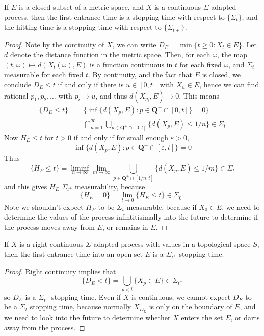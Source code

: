 \begin{lemma}
    If $E$ is a closed subset of a metric space, and $X$ is a continuous $\Sigma$ adapted process, then the first entrance time is a stopping time with respect to $\{ \Sigma_t \}$, and the hitting time is a stopping time with respect to $\{ \Sigma_{t+} \}$.
\end{lemma}
\begin{proof}
    Note by the continuity of $X$, we can write $D_E = \min \{ t \geq 0 : X_t \in E \}$. Let $d$ denote the distance function in the metric space. Then, for each $\omega$, the map $(t,\omega) \mapsto d(X_t(\omega), E)$ is a function continuous in $t$ for each fixed $\omega$, and $\Sigma_t$ measurable for each fixed $t$. By continuity, and the fact that $E$ is closed, we conclude $D_E \leq t$ if and only if there is $u \in [0,t]$ with $X_u \in E$, hence we can find rational $p_1, p_2, \dots$ with $p_i \to u$, and thus $d(X_{p_i}, E) \to 0$. This means
    \begin{align*}
        \{ D_E \leq t \} &= \{ \inf \{ d(X_p, E): p \in \mathbf{Q}^+ \cap [0,t] \} = 0 \} \\
        &= \bigcap_{n = 1}^\infty \bigcup_{p \in \mathbf{Q}^+ \cap [0,t]} \{ d(X_p,E) \leq 1/n \} \in \Sigma_t
    \end{align*}
    Now $H_E \leq t$ for $t > 0$ if and only if for small enough $\varepsilon > 0$,
    \[ \inf \{ d(X_p,E): p \in \mathbf{Q}^+ \cap [\varepsilon,t] \} = 0 \]
    Thus
    \[ \{ H_E \leq t \} = \liminf_{n \to \infty} \lim_{m \to \infty} \bigcup_{p \in \mathbf{Q}^+ \cap [1/n,t]} \{ d(X_p,E) \leq 1/m \} \in \Sigma_t \]
    and this gives $H_E$ $\Sigma_{t^+}$ measurability, because
    \[ \{ H_E = 0 \} = \lim_{t \to 0} \{ H_E \leq t \} \in \Sigma_{0^+} \]
    Note we shouldn't expect $H_E$ to be $\Sigma_t$ measurable, because if $X_0 \in E$, we need to determine the values of the process infintitisimally into the future to determine if the process moves away from $E$, or remains in $E$.
\end{proof}

\begin{lemma}
    If $X$ is a right continuous $\Sigma$ adapted process with values in a topological space $S$, then the first entrance time into an open set $E$ is a $\Sigma_{t^+}$ stopping time.
\end{lemma}
\begin{proof}
    Right continuity implies that
    \[ \{ D_E < t \} = \bigcup_{p < t} \{ X_p \in E \} \in \Sigma_{t^-} \]
    so $D_E$ is a $\Sigma_{t^+}$ stopping time. Even if $X$ is continuous, we cannot expect $D_E$ to be a $\Sigma_t$ stopping time, because normally $X_{D_E}$ is only on the boundary of $E$, and we need to look into the future to determine whether $X$ enters the set $E$, or darts away from the process.
\end{proof}

